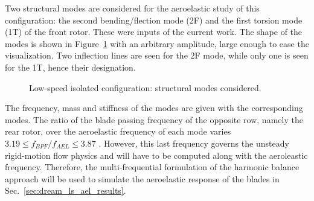 Two structural modes are considered for the aeroelastic study of this 
configuration: the second bending/flection mode (2F) 
and the first torsion mode (1T)
of the front rotor. These were inputs of the current work.
The shape of the modes is shown in Figure~\ref{fig:dream_ls_ael_modes}
with an arbitrary amplitude, large enough to ease the visualization.
Two inflection lines are seen for the 2F mode, while only
one is seen for the 1T, hence their designation.
\begin{figure}[htp]
  \centering
  \caption{Low-speed isolated configuration: structural modes considered.}
  \label{fig:dream_ls_ael_modes}
\end{figure}
The frequency, mass and stiffness of the modes 
are given with the corresponding modes.
The ratio  of the blade passing 
frequency of the opposite row, namely the rear rotor,
over the aeroelastic frequency of
each mode varies 
$3.19 \leq f_{BPF} / f_{AEL} \leq 3.87$
. However,
this last frequency governs the unsteady rigid-motion flow physics 
and will have to be computed along with the aeroleastic frequency.
Therefore, the multi-frequential formulation of the
harmonic balance approach will be used to simulate the
aeroelastic response of the blades in Sec.~\ref{sec:dream_ls_ael_results}.
